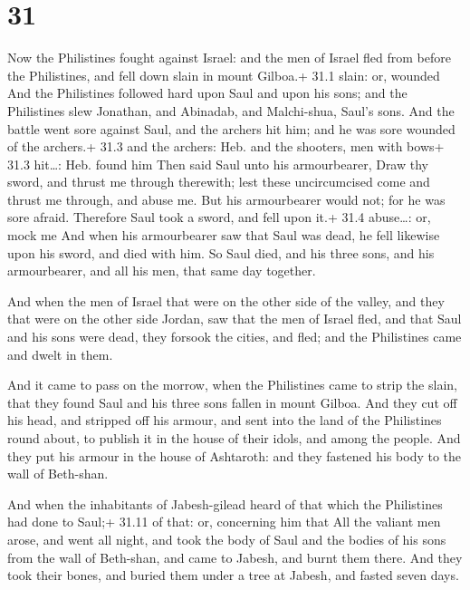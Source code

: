 \hypertarget{section-30}{%
\section{31}\label{section-30}}

 Now the Philistines fought against Israel: and the men of
Israel fled from before the Philistines, and fell down slain in mount
Gilboa.+ 31.1 slain: or, wounded  And the Philistines
followed hard upon Saul and upon his sons; and the Philistines slew
Jonathan, and Abinadab, and Malchi-shua, Saul's sons.  And
the battle went sore against Saul, and the archers hit him; and he was
sore wounded of the archers.+ 31.3 and the archers: Heb. and the
shooters, men with bows+ 31.3 hit\ldots: Heb. found him 
Then said Saul unto his armourbearer, Draw thy sword, and thrust me
through therewith; lest these uncircumcised come and thrust me through,
and abuse me. But his armourbearer would not; for he was sore afraid.
Therefore Saul took a sword, and fell upon it.+ 31.4 abuse\ldots: or,
mock me  And when his armourbearer saw that Saul was dead,
he fell likewise upon his sword, and died with him.  So Saul
died, and his three sons, and his armourbearer, and all his men, that
same day together.

 And when the men of Israel that were on the other side of
the valley, and they that were on the other side Jordan, saw that the
men of Israel fled, and that Saul and his sons were dead, they forsook
the cities, and fled; and the Philistines came and dwelt in them.

 And it came to pass on the morrow, when the Philistines
came to strip the slain, that they found Saul and his three sons fallen
in mount Gilboa.  And they cut off his head, and stripped
off his armour, and sent into the land of the Philistines round about,
to publish it in the house of their idols, and among the people.
 And they put his armour in the house of Ashtaroth: and
they fastened his body to the wall of Beth-shan.

 And when the inhabitants of Jabesh-gilead heard of that
which the Philistines had done to Saul;+ 31.11 of that: or, concerning
him that  All the valiant men arose, and went all night,
and took the body of Saul and the bodies of his sons from the wall of
Beth-shan, and came to Jabesh, and burnt them there.  And
they took their bones, and buried them under a tree at Jabesh, and
fasted seven days.
